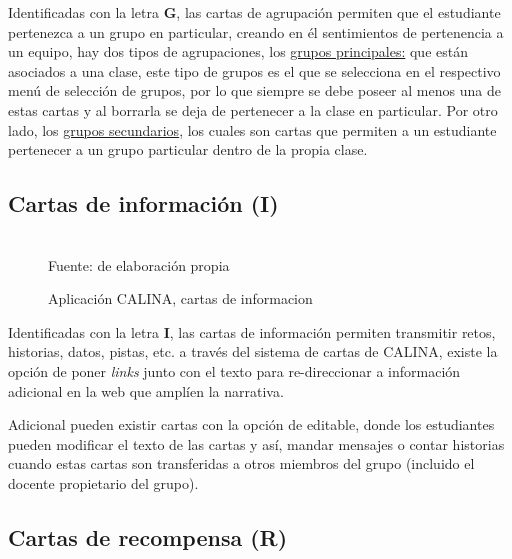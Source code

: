 Identificadas con la letra \textbf{G}, las cartas de agrupación permiten que el estudiante pertenezca a un 
grupo en particular, creando en él sentimientos de pertenencia a un equipo, hay dos tipos de agrupaciones, los 
\uline{grupos principales:} que están asociados a una clase, este tipo de grupos es el que se selecciona en el 
respectivo menú de selección de grupos, por lo que siempre se debe poseer al menos una de estas cartas y al 
borrarla se deja de pertenecer a la clase en particular. Por otro lado, los \uline{grupos secundarios}, los 
cuales son cartas que permiten a un estudiante pertenecer a un grupo particular dentro de la propia clase.

\subsection{Cartas de información (I)}

\begin{figure}[!htb]
\caption[]{Aplicación CALINA, cartas de informacion}
\centering
{}
\hspace{2cm}
\\
{\footnotesize Fuente: de elaboración propia}
\end{figure}

Identificadas con la letra \textbf{I}, las cartas de información permiten transmitir retos, historias, datos,
pistas, etc. a través del sistema de cartas de CALINA, existe la opción de poner \textit{links} junto con el 
texto para re-direccionar a información adicional en la web que amplíen la narrativa.

Adicional pueden existir cartas con la opción de editable, donde los estudiantes pueden modificar el texto de 
las cartas y así, mandar mensajes o contar historias cuando estas cartas son transferidas a otros miembros del 
grupo (incluido el docente propietario del grupo).

\subsection{Cartas de recompensa (R)}

